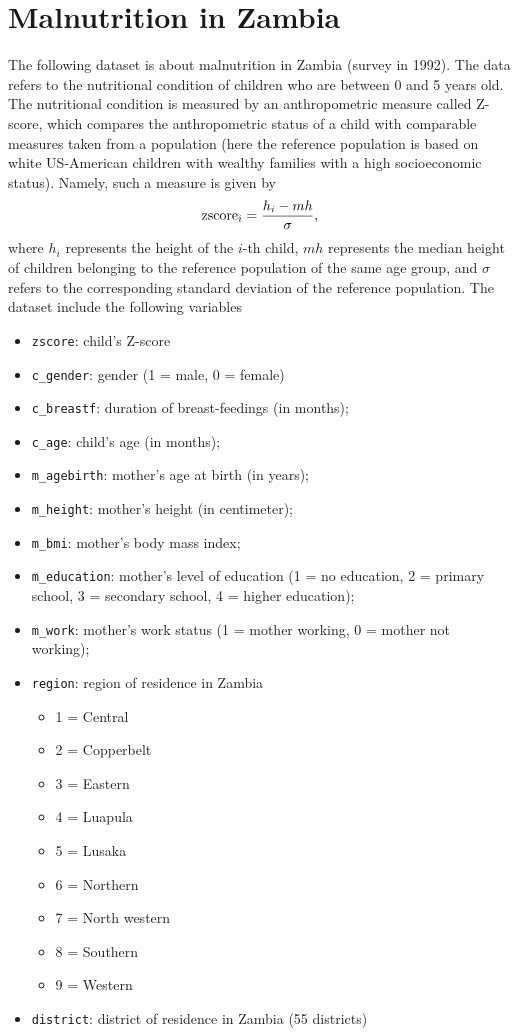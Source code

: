 \documentclass[10pt]{article}
\begin{document}
\section*{Malnutrition in Zambia}
The following dataset is about malnutrition in Zambia (survey in 1992). The data refers to the nutritional condition of children who are between 0 and 5 years old. The nutritional condition is measured by an anthropometric measure called Z-score, which compares the anthropometric status of a child with comparable measures taken from a population (here the reference population is based on white US-American children with wealthy families with a high socioeconomic status). Namely, such a measure is given by 
$${\rm zscore}_i = \frac{h_i - mh}{\sigma}, $$
where $h_i$ represents the height of the $i$-th child, $mh$ represents the median height of children belonging to the reference population of the same age group, and $\sigma$ refers to the corresponding standard deviation of the reference population. The  dataset include the following variables 
\begin{itemize}
\item \texttt{zscore}: child's Z-score
\item \texttt{c\_gender}:  gender (1 = male, 0 = female)
\item \texttt{c\_breastf}: duration of breast-feedings (in months);
\item \texttt{c\_age}:  child's age (in months);
\item \texttt{m\_agebirth}: mother's age at birth (in years); 
\item \texttt{m\_height}:  mother's height (in centimeter);
\item \texttt{m\_bmi}: mother's body mass index;
\item \texttt{m\_education}: mother's level of education (1 = no education, 2 = primary school, 3 = secondary school, 4 = higher education);
\item \texttt{m\_work}: mother's work status (1 = mother working, 0 = mother not working);
\item \texttt{region}: region of residence in Zambia
\begin{itemize}
\item 1 = Central
\item 2 = Copperbelt
\item 3 = Eastern 
\item 4 = Luapula
\item 5 = Lusaka
\item 6 = Northern 
\item 7 = North western
\item 8 = Southern
\item 9 = Western
\end{itemize}
\item \texttt{district}: district of residence in Zambia (55 districts)
\end{itemize}
\end{document}

